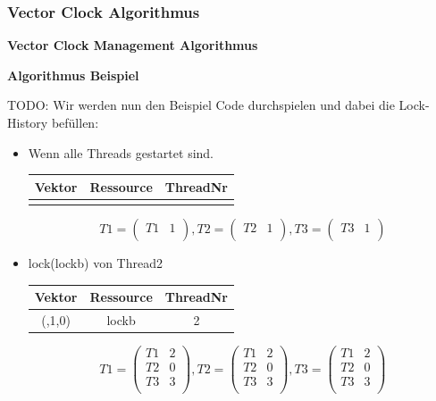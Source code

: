 \documentclass[10pt,a4paper]{article}
\begin{document}
\subsubsection{Vector Clock Algorithmus}\label{vector_algorithm}
\textbf{Vector Clock Management Algorithmus}
\begin{flushleft}

\end{flushleft}
\textbf{Algorithmus Beispiel}
\begin{flushleft}
TODO: Wir werden nun den Beispiel Code durchspielen und dabei die Lock-History befüllen:\\
\begin{itemize}
\item Wenn alle Threads gestartet sind.\\[0.3cm]
\begin{tabular}{ c c c }
  	Vektor & Ressource & ThreadNr \\\hline
  	  &   &   \\\hline
\end{tabular}
\[
	T1 = \begin{pmatrix}
		T1 & 1\\
	\end{pmatrix}
	, T2 = \begin{pmatrix}
		T2 & 1\\
	\end{pmatrix}
	, T3 = \begin{pmatrix}
		T3 & 1\\
	\end{pmatrix}
\]
\item lock(lockb) von Thread2\\[0.3cm]
\begin{tabular}{ c c c }
  	Vektor & Ressource & ThreadNr \\\hline
  	(,1,0) & lockb & 2 \\\hline
\end{tabular}
\[
	T1 = \begin{pmatrix}
		T1 & 2\\
		T2 & 0\\
		T3 & 3\\
	\end{pmatrix}
	, T2 = \begin{pmatrix}
		T1 & 2\\
		T2 & 0\\
		T3 & 3\\
	\end{pmatrix}
	, T3 = \begin{pmatrix}
		T1 & 2\\
		T2 & 0\\
		T3 & 3\\
	\end{pmatrix}
\]
\end{itemize}
\end{flushleft}
\end{document}
